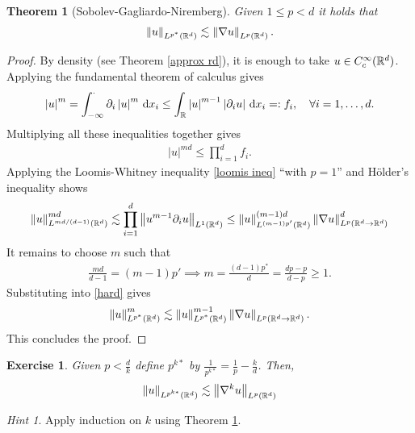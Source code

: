 \documentclass[12pt]{article}
\newtheorem{theorem}{Theorem}
\newtheorem{exercise}{Exercise}
\theoremstyle{remark}
\newtheorem*{hint}{Hint}
\renewcommand{\norm}[1]{\left\lVert #1 \right\rVert}\renewcommand{\abs}[1]{\left| #1 \right|}
\renewcommand{\d}{\,\mathrm{d}}
\begin{document}
\begin{theorem}[Sobolev-Gagliardo-Niremberg]\label{est1} Given $1 \leq p<d$ it holds that
	\begin{align}
		\norm{u}_{L^{p^*}(\R^d)}\lesssim  \norm{\nabla u}_{L^p (\R^d)}.
	\end{align}
\end{theorem}
\begin{proof}
	By density (see Theorem \ref{approx rd}), it is enough to take $u \in C_c^\infty(\mathbb{R}^d)$. Applying the fundamental theorem of calculus gives
	\begin{align*}
		\abs{u}^m=\int_{-\infty}^\cdot \partial _i \abs{u}^m \d x_i  \leq \int_{\R}\abs{u}^{m-1}\abs{\partial _i u} \d x_i=: f_i , \quad\forall i=1,\ldots,d.
	\end{align*}
	Multiplying all these inequalities together gives
	\begin{align*}
		\abs{u}^{md} \leq \prod_{i=1}^{d} f_i   .
	\end{align*}
	Applying the Loomis-Whitney inequality \eqref{loomis ineq}  ``with $p=1$'' and Hölder's inequality shows
	\begin{align}\label{hard}
		\norm{u}_{L^{ md /(d-1)}(\R^d)}^{md}\lesssim  \prod_{i=1}^{d}  \norm{u^{m-1}\partial_iu}_{L^1(\R^d)} \leq \norm{u}_{L^{(m-1)p'}(\R^d)}^{(m-1)d}\norm{\nabla u}_{L^{p}(\R^d \to  \R^d)}^d
	\end{align}
	It remains to choose $m$ such that
	\begin{align*}
		\frac{md}{d-1}= (m-1)p' \implies m= \frac{(d-1)p^*}{d} =\frac{dp -p}{d-p} \geq 1.
	\end{align*}
	Substituting into \eqref{hard} gives
	\begin{align*}
		\norm{u}_{L^{ p^*}(\R^d)}^{m}\lesssim \norm{u}_{L^{p^*}(\R^d)}^{m-1}\norm{\nabla u}_{L^{p}(\R^d \to  \R^d)} .
	\end{align*}
	This concludes the proof.
\end{proof}
\begin{exercise}\label{est12}
	Given $ p<\frac{d}{k}$ define    $p^{k*}$ by $\frac{1}{p^{k*}}=\frac{1}{p}-\frac{k}{d}$. Then,        \begin{align*}
		\norm{u}_{L^{p^{k*}}(\R^d)} \lesssim  \norm{\nabla^k u}_{L^p(\R^d)}    \end{align*}
\end{exercise}
\begin{hint}
	Apply induction on $k$ using Theorem \ref{est1}.
\end{hint}
\end{document}

